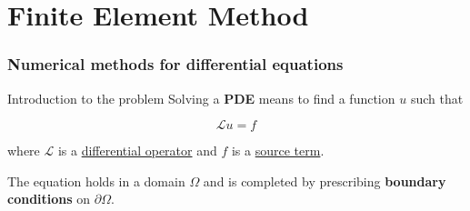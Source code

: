 \section{Finite Element Method}

\begin{frame}
   \frametitle{Numerical methods for differential equations}

   
\end{frame}

\begin{frame}{Introduction to the problem}
   Solving a \textbf{\textcolor{BrickRed}{PDE}} means to find a function $u$ such that

   \begin{equation*}
      \mathcal{L}u=f
   \end{equation*}

   where $\mathcal{L}$ is a \underline{differential operator} and $f$ is a \underline{source term}.

   \vspace{0.3cm}

   The equation holds in a domain $\Omega$ and is completed by prescribing \textbf{boundary conditions} on $\partial\Omega$.

   \vfill

   \pause

   
\end{frame}

